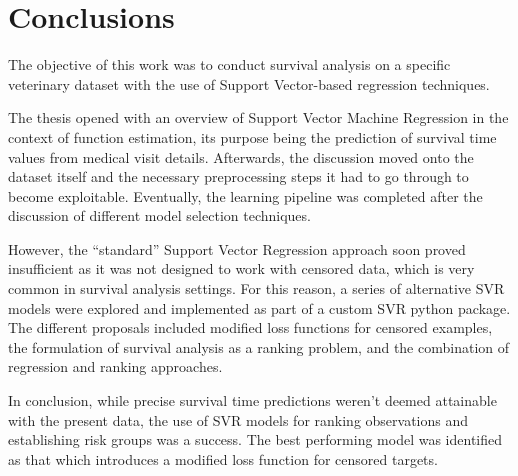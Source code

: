 \documentclass[12pt]{report}
\begin{document}
\chapter*{Conclusions}
\label{concl}
The objective of this work was to conduct survival analysis on a specific veterinary dataset with the use of Support Vector-based regression techniques.

The thesis opened with an overview of Support Vector Machine Regression in the context of function estimation, its purpose being the prediction of survival time values from medical visit details. Afterwards, the discussion moved onto the dataset itself and the necessary preprocessing steps it had to go through to become exploitable. Eventually, the learning pipeline was completed after the discussion of different model selection techniques.

However, the ``standard'' Support Vector Regression approach soon proved insufficient as it was not designed to work with censored data, which is very common in survival analysis settings. For this reason, a series of alternative SVR models were explored and implemented as part of a custom SVR python package. The different proposals included modified loss functions for censored examples, the formulation of survival analysis as a ranking problem, and the combination of regression and ranking approaches.

In conclusion, while precise survival time predictions weren't deemed attainable with the present data, the use of SVR models for ranking observations and establishing risk groups was a success. The best performing model was identified as that which introduces a modified loss function for censored targets.

%
%
 

% 
\end{document}
